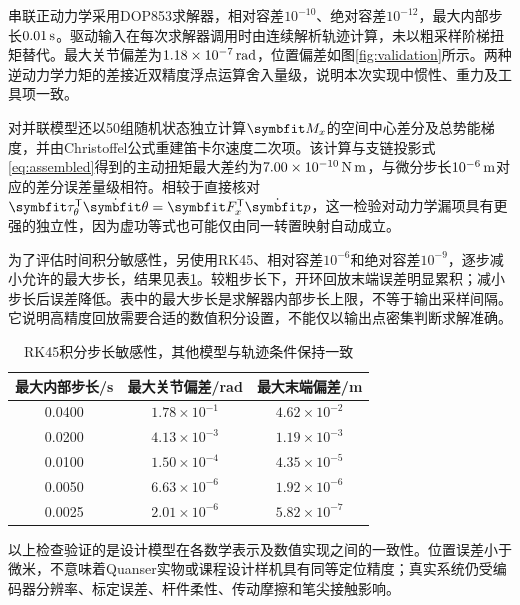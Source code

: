 串联正动力学采用DOP853求解器，相对容差$10^{-10}$、绝对容差$10^{-12}$，最大内部步长$0.01\,\mathrm{s}$。驱动输入在每次求解器调用时由连续解析轨迹计算，未以粗采样阶梯扭矩替代。最大关节偏差为$1.18\times10^{-7}\,\mathrm{rad}$，位置偏差如图\ref{fig:validation}所示。两种逆动力学力矩的差接近双精度浮点运算舍入量级，说明本次实现中惯性、重力及工具项一致。


对并联模型还以50组随机状态独立计算$\vect M_x$的空间中心差分及总势能梯度，并由Christoffel公式重建笛卡尔速度二次项。该计算与支链投影式\eqref{eq:assembled}得到的主动扭矩最大差约为$7.00\times10^{-10}\,\mathrm{N\,m}$，与微分步长$10^{-6}\,\mathrm{m}$对应的差分误差量级相符。相较于直接核对$\vect\tau_\theta^\T\dot{\vect\theta}=\vect F_x^\T\dot{\vect p}$，这一检验对动力学漏项具有更强的独立性，因为虚功等式也可能仅由同一转置映射自动成立。

为了评估时间积分敏感性，另使用RK45、相对容差$10^{-6}$和绝对容差$10^{-9}$，逐步减小允许的最大步长，结果见表\ref{tab:convergence}。较粗步长下，开环回放末端误差明显累积；减小步长后误差降低。表中的最大步长是求解器内部步长上限，不等于输出采样间隔。它说明高精度回放需要合适的数值积分设置，不能仅以输出点密集判断求解准确。

\begin{table}[htbp]
\centering\caption{RK45积分步长敏感性，其他模型与轨迹条件保持一致}\label{tab:convergence}
\begin{tabular}{ccc}\toprule 最大内部步长/s & 最大关节偏差/rad & 最大末端偏差/m\\\midrule
0.0400 & $1.78\times10^{-1}$ & $4.62\times10^{-2}$\\
0.0200 & $4.13\times10^{-3}$ & $1.19\times10^{-3}$\\
0.0100 & $1.50\times10^{-4}$ & $4.35\times10^{-5}$\\
0.0050 & $6.63\times10^{-6}$ & $1.92\times10^{-6}$\\
0.0025 & $2.01\times10^{-6}$ & $5.82\times10^{-7}$\\\bottomrule
\end{tabular}
\end{table}

以上检查验证的是设计模型在各数学表示及数值实现之间的一致性。位置误差小于微米，不意味着Quanser实物或课程设计样机具有同等定位精度；真实系统仍受编码器分辨率、标定误差、杆件柔性、传动摩擦和笔尖接触影响。

